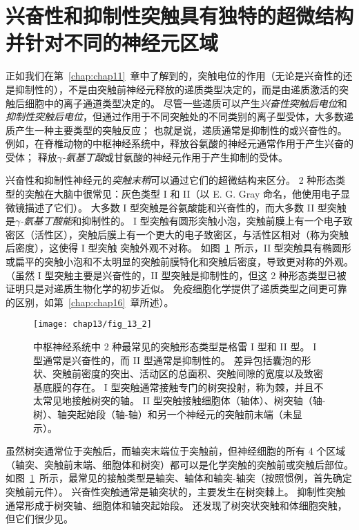 \section{兴奋性和抑制性突触具有独特的超微结构并针对不同的神经元区域}

正如我们在第~\ref{chap:chap11}~章中了解到的，突触电位的作用（无论是兴奋性的还是抑制性的），不是由突触前神经元释放的递质类型决定的，而是由递质激活的突触后细胞中的离子通道类型决定的。
尽管一些递质可以产生\textit{兴奋性突触后电位}和\textit{抑制性突触后电位}，但通过作用于不同突触处的不同类别的离子型受体，大多数递质产生一种主要类型的突触反应；
也就是说，递质通常是抑制性的或兴奋性的。
例如，在脊椎动物的中枢神经系统中，释放谷氨酸的神经元通常作用于产生兴奋的受体；
释放\textit{$\gamma$-氨基丁酸}或甘氨酸的神经元作用于产生抑制的受体。


兴奋性和抑制性神经元的\textit{突触末稍}可以通过它们的超微结构来区分。
2 种形态类型的突触在大脑中很常见：灰色类型 I 和 II（以 E. G. Gray 命名，他使用电子显微镜描述了它们）。
大多数 I 型突触是谷氨酸能和兴奋性的，而大多数 II 型突触是\textit{$\gamma$-氨基丁酸能}和抑制性的。
I 型突触有圆形突触小泡，突触前膜上有一个电子致密区（活性区），突触后膜上有一个更大的电子致密区，与活性区相对（称为突触后密度），这使得 I 型突触 突触外观不对称。 
如图~\ref{fig:13_2}~所示，II 型突触具有椭圆形或扁平的突触小泡和不太明显的突触前膜特化和突触后密度，导致更对称的外观。 
（虽然 I 型突触主要是兴奋性的，II 型突触是抑制性的，但这 2 种形态类型已被证明只是对递质生物化学的初步近似。
免疫细胞化学提供了递质类型之间更可靠的区别，如第~\ref{chap:chap16}~章所述）。


\begin{figure}[htbp]
	\centering
	\texttt{[image: chap13/fig\_13\_2]}
	\caption{中枢神经系统中 2 种最常见的突触形态类型是格雷 I 型和 II 型。
		I 型通常是兴奋性的，而 II 型通常是抑制性的。
		差异包括囊泡的形状、突触前密度的突出、活动区的总面积、突触间隙的宽度以及致密基底膜的存在。
		I 型突触通常接触专门的树突投射，称为棘，并且不太常见地接触树突的轴。
		II 型突触接触细胞体（轴体）、树突轴（轴-树）、轴突起始段（轴-轴）和另一个神经元的突触前末端（未显示）。}
	\label{fig:13_2}
\end{figure}


虽然树突通常位于突触后，而轴突末端位于突触前，但神经细胞的所有 4 个区域（轴突、突触前末端、细胞体和树突）都可以是化学突触的突触前或突触后部位。
如图~\ref{fig:13_2}~所示，最常见的接触类型是轴突、轴体和轴突-轴突（按照惯例，首先确定突触前元件）。
兴奋性突触通常是轴突状的，主要发生在树突棘上。
抑制性突触通常形成于树突轴、细胞体和轴突起始段。
还发现了树突状突触和体细胞突触，但它们很少见。


